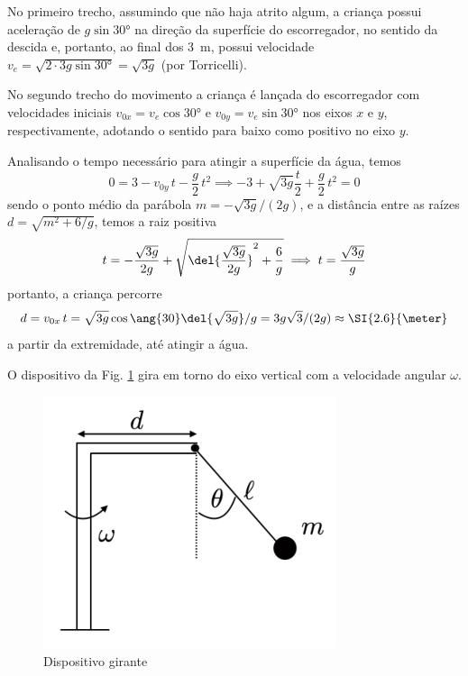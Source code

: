 \documentclass[]{IMTexam}
\begin{document}
\begin{questions}
\begin{solution}
		No primeiro trecho, assumindo que não haja atrito algum, a criança possui aceleração de $ g\sin\ang{30} $ na direção da superfície do escorregador, no sentido da descida e, portanto, ao final dos \SI{3}{\meter}, possui velocidade $ v_e=\sqrt{2\cdot3g\sin\ang{30}}=\sqrt{3g} $ (por Torricelli).

		No segundo trecho do movimento a criança é lançada do escorregador com velocidades iniciais $ v_{0x}=v_e\cos\ang{30} $ e $ v_{0y}=v_e\sin\ang{30} $ nos eixos $ x $ e $ y $, respectivamente, adotando o sentido para baixo como positivo no eixo $ y $.

		Analisando o tempo necessário para atingir a superfície da água, temos
		\[ 0=3-v_{0y}\,t-\dfrac{g}{2}\,t^{2}\implies -3+\sqrt{3g}\dfrac{t}{2}+\dfrac{g}{2}\,t^{2}=0  \]
		sendo o ponto médio da parábola $ m=-\sqrt{3g}/(2g) $, e a distância entre as raízes $ d=\sqrt{m^{2}+6/g} $, temos a raiz positiva
		\[ t=-\dfrac{\sqrt{3g}}{2g}+\sqrt{\del{\dfrac{\sqrt{3g}}{2g}}^{2}+\dfrac{6}{g}}\implies t=\dfrac{\sqrt{3g}}{g} \]
		portanto, a criança percorre
		\[ d=v_{0x}\,t=\sqrt{3g}\cos\ang{30}\del{\sqrt{3g}}/g=3g\sqrt{3}/(2g)\approx\SI{2.6}{\meter} \] a partir da extremidade, até atingir a água.
	\end{solution}



	\question
	O dispositivo da Fig. \ref{fig:fig1} gira em torno do eixo vertical com a velocidade angular $\omega$.

	\begin{figure}[H]
		\centering
		\includegraphics[width=0.35\linewidth]{screenshot001}
		\caption{Dispositivo girante}
		\label{fig:fig1}
	\end{figure}

\end{questions}
\end{document}
